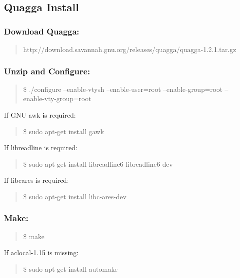 \subsection{Quagga Install}\label{quagga-install-and-configuration}

\subsubsection{Download Quagga:}\label{download-quagga}

\begin{quote}
http://download.savannah.gnu.org/releases/quagga/quagga-1.2.1.tar.gz
\end{quote}

\subsubsection{Unzip and Configure:}\label{unzip-and-configure}

\begin{quote}
\$ ./configure --enable-vtysh --enable-user=root --enable-group=root --enable-vty-group=root
\end{quote}

If GNU awk is required:

\begin{quote}
\$ sudo apt-get install gawk
\end{quote}

If libreadline is required:

\begin{quote}
\$ sudo apt-get install libreadline6 libreadline6-dev
\end{quote}

If libcares is required:

\begin{quote}
\$ sudo apt-get install libc-ares-dev
\end{quote}

\subsubsection{Make:}\label{make}

\begin{quote}
\$ make
\end{quote}

If aclocal-1.15 is missing:

\begin{quote}
\$ sudo apt-get install automake
\end{quote}


